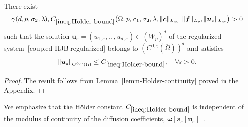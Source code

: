 \documentclass[final,onefignum,onetabnum]{mousaviart}
\begin{document}
	\begin{lemma}
		\label{lem:Holder-continuity}
		There exist
		\[
		\gamma(d, p, \sigma_2, \lambda),  C_{\ref{ineq:Holder-bound}}\bigl(\Omega, p, \sigma_1, \sigma_2, \lambda, \|\boldsymbol{c}\|_{L_\infty}, \|\boldsymbol{f}\|_{L_p}, \|\boldsymbol{u}_{\varepsilon}\|_{L_\infty} \bigr) > 0
		\]
		such that the solution $\boldsymbol{u}_{\varepsilon} = \left( u_{1,\varepsilon}, \dots, u_{d,\varepsilon} \right) \in (W_p)^d$ of the regularized system~\eqref{coupled-HJB-regularized} belongs to $\left( C^{0,\gamma}(\overline{\Omega}) \right)^d$ and satisfies
		\begin{equation}
			\label{ineq:Holder-bound}
			\left\| \boldsymbol{u}_{\varepsilon} \right\|_{C^{0,\gamma}(\Omega)}
			\le
			C_{\ref{ineq:Holder-bound}},
			\quad \forall \varepsilon > 0.
		\end{equation}
	\end{lemma}
	\begin{proof}
		The result follows from Lemma~\ref{lemm-Holder-continuity} proved in the Appendix.
	\end{proof}
	\begin{remark}
		We emphasize that the Hölder constant $C_{\ref{ineq:Holder-bound}}$ is independent of the modulus of continuity of the diffusion coefficients, $\boldsymbol{\omega}\left[ \boldsymbol{a}_{ \varepsilon}[\boldsymbol{u}_{\varepsilon}] \right] $.   
	\end{remark}
\end{document}
